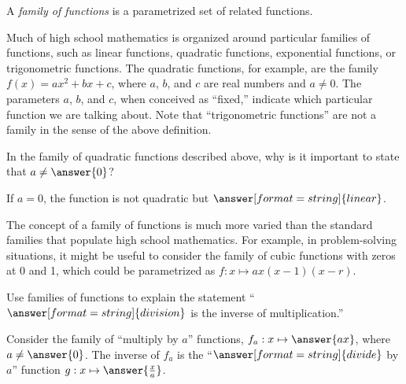 \documentclass{ximera}
\begin{document}
\begin{definition}
A \emph{family of functions} is a parametrized set of related functions.  
\end{definition}

Much of high school mathematics is organized around particular families of functions, such as linear functions, quadratic functions, exponential functions, or trigonometric functions.  The quadratic functions, for example, are the family $f(x)=ax^2+bx+c$, where $a$, $b$, and $c$ are real numbers and $a\neq 0$.  The parameters $a$, $b$, and $c$, when conceived as ``fixed,'' indicate which particular function we are talking about.  Note that ``trigonometric functions'' are not a family in the sense of the above definition.  

\begin{question}
In the family of quadratic functions described above, why is it important to state that $a\neq \answer{0}$?
\begin{solution}
If $a=0$, the function is not quadratic but $\answer[format=string]{linear}$.
\end{solution}
\end{question}

The concept of a family of functions is much more varied than the standard families that populate high school mathematics.  For example, in problem-solving situations, it might be useful to consider the family of cubic functions with zeros at 0 and 1, which could be parametrized as $f:x\mapsto ax(x-1)(x-r)$.  

\begin{question}
Use families of functions to explain the statement ``$\answer[format=string]{division}$ is the inverse of 
multiplication.''  
\begin{solution}
Consider the family of ``multiply by $a$'' functions, $f_a:x\mapsto \answer{ax}$, where $a\neq \answer{0}$.  The inverse of $f_a$ is the ``$\answer[format=string]{divide}$ by $a$'' function $g:x\mapsto \answer{\frac{x}{a}}$.   
\end{solution}
\end{question}



%
%
\end{document}
